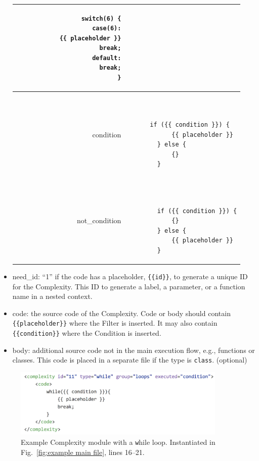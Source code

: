 \documentclass[12pt]{article}
\begin{document}
\begin{itemize}
\begin{table}[H]
\begin{tabular}{|r|l|}
\begin{minipage}{3in}
\begin{verbatim}
        switch(6) {
          case(6):
            {{ placeholder }}
            break;
          default:
            break;
        }
    \end{verbatim}
    \end{minipage}
    \\
    \hline
    condition &
    \begin{minipage}{3in}
    \begin{verbatim}


      if ({{ condition }}) {
            {{ placeholder }}
        } else {
            {}
        }
    \end{verbatim}
    \end{minipage}
    \\
    \hline
    not\_condition &
    \begin{minipage}{3in}
    \begin{verbatim}


        if ({{ condition }}) {
            {}
        } else {
            {{ placeholder }}
        }
    \end{verbatim}
    \end{minipage}
    \\
    \hline
    \end{tabular}
    \label{tab:execution examples}
    \end{table}

    \item need\_id: ``1'' if the code has a placeholder, \verb|{{id}}|,
    to generate a unique ID for the Complexity.  This ID to generate 
    a label, a parameter, or a function name in a nested
    context.

    \item code: the source code of the Complexity.  Code or 
    body should contain \\ \verb|{{placeholder}}|
    where the Filter is inserted.  It may also contain
    \verb|{{condition}}| where the Condition
    is inserted.

    \item body: additional source code not in the main execution flow,
    e.g., functions or classes.  This code is placed in a separate file
    if the type is \verb|class|. (optional)
\end{itemize}


\begin{figure}[htbp]
  \includegraphics[width=4in]{fig_Complexity_file_while.png}
  \caption{Example Complexity module with a {\texttt while} loop.  Instantiated in 
    Fig.~\ref{fig:example main file}, lines 16--21.}
  \label{fig:example complexity-while file}
\end{figure}
\end{document}
